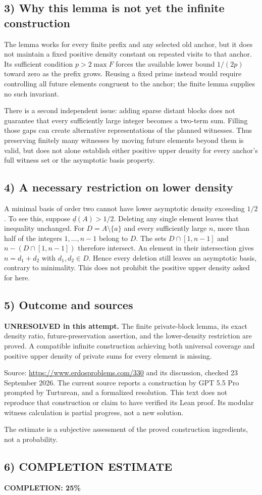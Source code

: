 \subsection*{3) Why this lemma is not yet the infinite construction}
The lemma works for every finite prefix and any selected old anchor, but it does not maintain a fixed positive density constant on repeated visits to that anchor. Its sufficient condition $p>2\max F$ forces the available lower bound $1/(2p)$ toward zero as the prefix grows. Reusing a fixed prime instead would require controlling all future elements congruent to the anchor; the finite lemma supplies no such invariant.

There is a second independent issue: adding sparse distant blocks does not guarantee that every sufficiently large integer becomes a two-term sum. Filling those gaps can create alternative representations of the planned witnesses. Thus preserving finitely many witnesses by moving future elements beyond them is valid, but does not alone establish either positive upper density for every anchor's full witness set or the asymptotic basis property.

\subsection*{4) A necessary restriction on lower density}
A minimal basis of order two cannot have lower asymptotic density exceeding $1/2$. To see this, suppose $\underline d(A)>1/2$. Deleting any single element leaves that inequality unchanged. For $D=A\setminus\{a\}$ and every sufficiently large $n$, more than half of the integers $1,\ldots,n-1$ belong to $D$. The sets $D\cap[1,n-1]$ and $n-(D\cap[1,n-1])$ therefore intersect. An element in their intersection gives $n=d_1+d_2$ with $d_1,d_2\in D$. Hence every deletion still leaves an asymptotic basis, contrary to minimality. This does not prohibit the positive upper density asked for here.

\subsection*{5) Outcome and sources}
\textbf{UNRESOLVED in this attempt.} The finite private-block lemma, its exact density ratio, future-preservation assertion, and the lower-density restriction are proved. A compatible infinite construction achieving both universal coverage and positive upper density of private sums for every element is missing.

Source: \url{https://www.erdosproblems.com/330} and its discussion, checked 23 September 2026. The current source reports a construction by GPT 5.5 Pro prompted by Turturean, and a formalized resolution. This text does not reproduce that construction or claim to have verified its Lean proof. Its modular witness calculation is partial progress, not a new solution.

The estimate is a subjective assessment of the proved construction ingredients, not a probability.
\subsection*{6) COMPLETION ESTIMATE}
\textbf{COMPLETION: 25\%}
